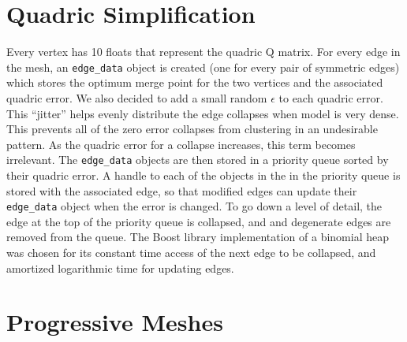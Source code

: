 \documentclass[11pt]{article}
\begin{document}
\section{Quadric Simplification}

Every vertex has 10 floats that represent the quadric Q matrix. For every edge in the mesh, an \verb`edge_data` object is created (one for every pair of symmetric edges) which stores the optimum merge point for the two vertices and the associated quadric error. We also decided to add a small random $\epsilon$ to each quadric error. This ``jitter'' helps evenly distribute the edge collapses when model is very dense. This prevents all of the zero error collapses from clustering in an undesirable pattern. As the quadric error for a collapse increases, this term becomes irrelevant. The \verb`edge_data` objects are then stored in a priority queue sorted by their quadric error. A handle to each of the objects in the in the priority queue is stored with the associated edge, so that modified edges can update their \verb`edge_data` object when the error is changed. To go down a level of detail, the edge at the top of the priority queue is collapsed, and and degenerate edges are removed from the queue. The Boost library implementation of a binomial heap was chosen for its constant time access of the next edge to be collapsed, and amortized logarithmic time for updating edges.

\section{Progressive Meshes}
\end{document}
